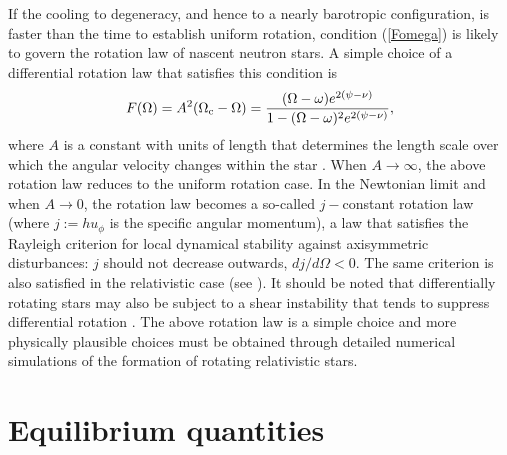 \documentclass[12pt]{article}
\begin{document}
If the cooling to degeneracy, and hence to a nearly barotropic 
configuration, is faster than the time to establish uniform rotation,
condition (\ref{Fomega}) is likely to govern the rotation law 
of nascent neutron stars. 
A simple choice of a differential rotation law that satisfies 
this condition is
\begin{equation}
F(\Omega)= A^2(\Omega_{\rm c}-\Omega) = \frac{(\Omega-\omega)
e^{2(\psi-\nu)}}{1-(\Omega -\omega)^2e^{2(\psi-\nu)}},
\label{eq:diffKEH}
\end{equation}
where $A$ is a constant with units of length that determines
the length scale over which the angular velocity changes within
the star \cite{KEH89a,KEH89b}.
When $A \to \infty$, the
above rotation law reduces to the uniform rotation case. In the
Newtonian limit and when $A \to 0$, the rotation law becomes a
so-called $j-$constant rotation law (where $j:=h u_\phi$ is the 
specific angular momentum), a law that satisfies the Rayleigh 
criterion for local dynamical stability against axisymmetric 
disturbances: $j$ should not decrease outwards, $dj/d\Omega<0$. 
The same criterion is also satisfied
in the relativistic case (see \cite{KEH89b}). It should be noted that
differentially rotating stars may also be subject to a shear
instability that tends to suppress differential rotation
\cite{Zahn93}.
The above rotation law is a simple choice and more physically 
plausible choices must be obtained through detailed numerical simulations 
of the formation of rotating relativistic stars.



\section{Equilibrium quantities}
\label{sec:equilibrium}
\end{document}
